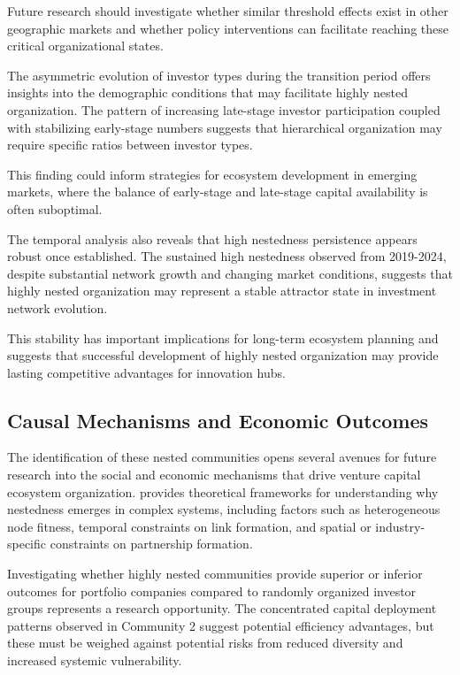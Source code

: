 Future research should investigate whether similar threshold effects exist in other geographic markets and whether policy interventions can facilitate reaching these critical organizational states.

The asymmetric evolution of investor types during the transition period offers insights into the demographic conditions that may facilitate highly nested organization. The pattern of increasing late-stage investor participation coupled with stabilizing early-stage numbers suggests that hierarchical organization may require specific ratios between investor types. 

This finding could inform strategies for ecosystem development in emerging markets, where the balance of early-stage and late-stage capital availability is often suboptimal.

The temporal analysis also reveals that high nestedness persistence appears robust once established. The sustained high nestedness observed from 2019-2024, despite substantial network growth and changing market conditions, suggests that highly nested organization may represent a stable attractor state in investment network evolution. 

This stability has important implications for long-term ecosystem planning and suggests that successful development of highly nested organization may provide lasting competitive advantages for innovation hubs.

\subsection{Causal Mechanisms and Economic Outcomes}

The identification of these nested communities opens several avenues for future research into the social and economic mechanisms that drive venture capital ecosystem organization. \cite{Mariani2019} provides theoretical frameworks for understanding why nestedness emerges in complex systems, including factors such as heterogeneous node fitness, temporal constraints on link formation, and spatial or industry-specific constraints on partnership formation.

Investigating whether highly nested communities provide superior or inferior outcomes for portfolio companies compared to randomly organized investor groups represents a research opportunity. The concentrated capital deployment patterns observed in Community 2 suggest potential efficiency advantages, but these must be weighed against potential risks from reduced diversity and increased systemic vulnerability.

